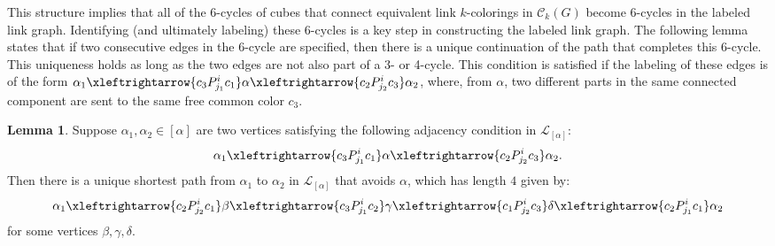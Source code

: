 \documentclass{amsart}
\theoremstyle{hypothesisstyle}
\theoremstyle{definition}
\newtheorem{lemma}[theorem]{Lemma}
\theoremstyle{remark}
\numberwithin{equation}{section}
\newcommand{\C}{\mathcal C}
\begin{document}
This structure implies that all of the 6-cycles of cubes that connect equivalent link $k$-colorings in $\C_k(G)$ become 6-cycles in the labeled link graph.  Identifying (and ultimately labeling) these 6-cycles is a key step in constructing the labeled link graph. The following lemma states that if two consecutive edges in the 6-cycle are specified, then there is a unique continuation of the path that completes this 6-cycle. This uniqueness holds as long as the two edges are not also part of a 3- or 4-cycle.  This condition is satisfied if the labeling of these edges is of the form $\alpha_1 
 \xleftrightarrow{c_3 P^i_{j_1}c_1}  \alpha  \xleftrightarrow{c_2 P^i_{j_2} c_3} \alpha_2$, where, from $\alpha$, two different parts in the same connected component are sent to the same free common color $c_3$.

\begin{lemma}\label{lem:length-4-path}
Suppose $\alpha_1, \alpha_2\in [\alpha]$ are two vertices satisfying the following adjacency condition in $\mathcal{L}_{[\alpha]}$: 
\[ \alpha_1 
 \xleftrightarrow{c_3 P^i_{j_1}c_1}  \alpha  \xleftrightarrow{c_2 P^i_{j_2} c_3} \alpha_2.
\]
Then there is a unique shortest path from $\alpha_1$ to $\alpha_2$ in $\mathcal{L}_{[\alpha]}$ that avoids $\alpha$, which has length $4$ given by:
\[
\alpha_1\xleftrightarrow{c_2P^i_{j_2}c_1} \beta\xleftrightarrow{c_3P^i_{j_1}c_2}\gamma \xleftrightarrow{c_1P^i_{j_2}c_3} \delta\xleftrightarrow{c_2P^i_{j_1}c_1} \alpha_2
\]
for some vertices $\beta, \gamma, \delta$.
\end{lemma}
\end{document}
